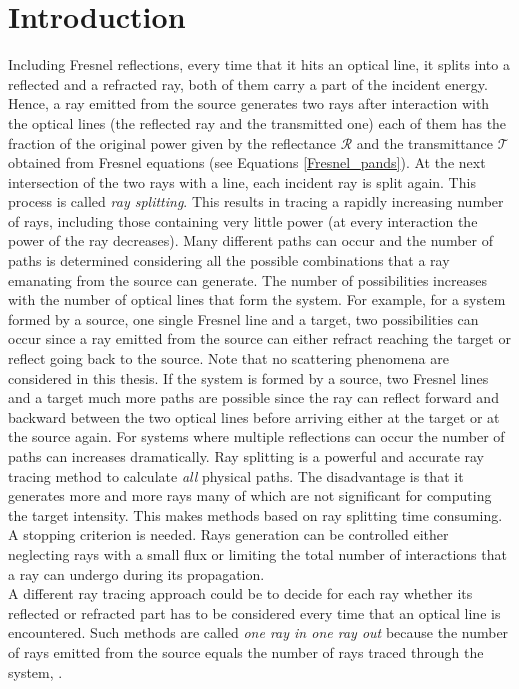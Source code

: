 \section{Introduction}
Including Fresnel reflections, every time that it hits an optical line, it splits into a reflected and a refracted ray, both of them carry a part of the incident energy.
Hence, a ray emitted from the source generates two rays after interaction with the optical lines (the reflected ray and the transmitted one) each of them has the fraction of the original power given by the reflectance $\mathcal{R}$ and the transmittance $\mathcal{T}$ obtained from Fresnel equations (see Equations \ref{Fresnel_pands}).
At the next intersection of the two rays with a line, each incident ray is split
again. This process is called \textit{ray splitting}. 
This results in tracing a rapidly increasing number of rays, including those containing very little power (at every interaction the power of the ray decreases). 
Many different paths can occur and the number of paths is determined considering all the possible combinations that a ray emanating from the source can generate. The number of possibilities increases with the number of optical lines that form the system. For example, for a system formed by a source, one single Fresnel line and a target, two possibilities can occur since a ray emitted from the source can either refract reaching the target or reflect going back to the source. Note that no scattering phenomena are considered in this thesis. If the system is formed by a source, two Fresnel lines and a target much more paths are possible since the ray can reflect forward and backward between the two optical lines before arriving either at the target or at the source again. For systems where multiple reflections can occur the number of paths can increases dramatically. Ray splitting is a powerful and accurate ray tracing method to calculate \textit{all} physical paths. The disadvantage is that it generates more and more rays many of which are not significant for computing the target intensity. This makes methods based on ray splitting time consuming. A stopping criterion is needed. Rays generation can be controlled either neglecting rays with a small flux or limiting the total number of interactions that a ray can undergo during its propagation. \\ \indent A different ray tracing approach could be to decide for each ray whether its reflected or refracted part has to be considered every time that an optical line is encountered. Such methods are called \textit{one ray in one ray out} because the number of rays emitted from the source equals the number of rays traced through the system, \cite{koshel2012illumination}.\\ \indent
